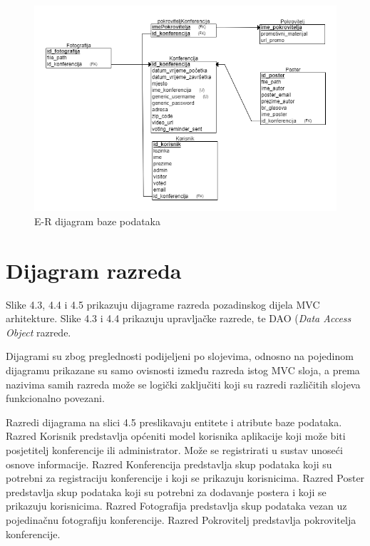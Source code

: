 					\begin{figure} [h]
						\includegraphics[width=\linewidth]{Slike/ERDijagram}
						\caption{E-R dijagram baze podataka}
					\end{figure}
			
			\eject
			
			
		\section{Dijagram razreda}
			
			\indent Slike 4.3, 4.4 i 4.5 prikazuju dijagrame razreda pozadinskog dijela MVC arhitekture. Slike 4.3 i 4.4 prikazuju upravljačke razrede, te DAO (\textit{Data Access Object} razrede. 
			
			Dijagrami su zbog preglednosti podijeljeni po slojevima, odnosno na pojedinom dijagramu prikazane su samo ovisnosti između razreda istog MVC sloja, a prema nazivima samih razreda može se logički zaključiti koji su razredi različitih slojeva funkcionalno povezani.
			
			Razredi dijagrama na slici 4.5 preslikavaju entitete i atribute baze podataka. Razred Korisnik predstavlja općeniti model korisnika aplikacije koji može biti posjetitelj konferencije ili administrator. Može se registrirati u sustav unoseći osnove informacije. Razred Konferencija predstavlja skup podataka koji su potrebni za registraciju konferencije i koji se prikazuju korisnicima. Razred Poster predstavlja skup podataka koji su potrebni za dodavanje postera i koji se prikazuju korisnicima. Razred Fotografija predstavlja skup podataka vezan uz pojedinačnu fotografiju konferencije. Razred Pokrovitelj predstavlja pokrovitelja konferencije.
			
